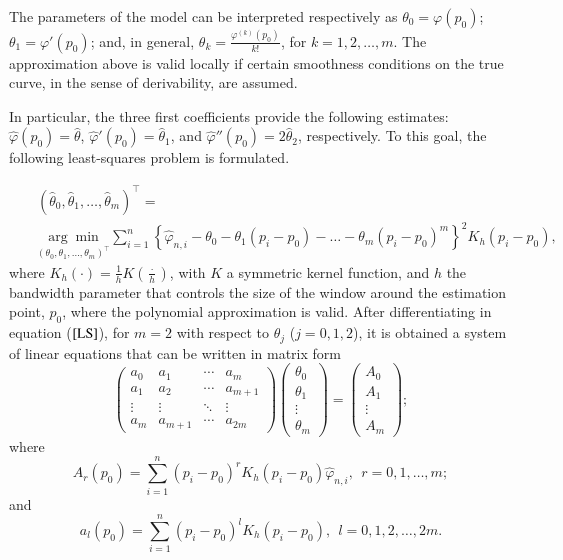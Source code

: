 \documentclass[preprint,12pt]{elsarticle}
\begin{document}
The parameters of the model can be interpreted respectively as $\theta_0={\varphi}(p_0)$; ${\theta}_1={\varphi'}(p_0)$; and, in general, ${\theta}_k=\frac{\varphi^{(k)}(p_0)}{k!}$, for $k=1,2,\ldots,m$. The approximation above is valid locally if certain smoothness conditions on the true curve, in the sense of derivability, are assumed. 

In particular, the three first coefficients provide the following estimates: $\widehat{\varphi}(p_0)=\widehat{\theta}$, $\widehat{\varphi}'(p_0)=\widehat{\theta}_1$, and $\widehat{\varphi}''(p_0)=2\widehat{\theta}_2$, respectively.
To this goal, the following least-squares problem is formulated.

\begin{eqnarray}\label{LS}
&&\left(\widehat{\theta}_0,\widehat{\theta}_1,\ldots,\widehat{\theta}_m\right)^{\intercal}= \\
\nonumber &&\underset{\left({\theta}_0,\theta_1,\ldots, {\theta}_m\right)^{\intercal}}{\arg \min} \sum_{i=1}^n\left\{\widehat{\varphi}_{n,i}-\theta_0-\theta_1(p_i-p_0)-\ldots-\theta_m(p_i-p_0)^m\right\}^2 K_h(p_i-p_0),
\end{eqnarray}
where $K_h(\cdot)=\frac{1}{h}K(\frac{\cdot}{h})$, with $K$ a symmetric kernel function, and $h$ the bandwidth parameter that controls the size of the window around the estimation point, $p_0$, where the polynomial approximation is valid.
After differentiating in equation ($\ref{LS}$), for $m=2$ with respect to $\theta_j$ ($j=0, 1, 2$), it is obtained a system of linear equations that can be written in matrix form
\begin{equation}\label{score}
\left(\begin{array}{cccc}
a_0 & a_1&\cdots &a_m \\ 
a_{1} & a_2&\cdots &a_{m+1}\\
\vdots & \vdots &\ddots &\vdots \\ 
a_m & a_{m+1}&\cdots &a_{2 m} 
\end{array}\right)
\left(\begin{array}{c}
 \theta_0 \\ 
\theta_1 \\ 
\vdots \\
\theta_m
 \end{array}\right)=
\left(\begin{array}{c} 
A_0 \\ 
A_1 \\ 
\vdots \\
A_m
 \end{array}\right);
\end{equation}
where 
\begin{equation}\label{bigA}
A_r(p_0)=\sum_{i=1}^n (p_i-p_0)^r K_h(p_i-p_0)\widehat{\varphi}_{n,i}, \ \ r=0,1,\ldots,m;
\end{equation}
and 
\begin{equation}\label{smallA}
a_l(p_0)=\sum_{i=1}^n(p_i-p_0)^l K_h(p_i-p_0), \ \ l=0,1,2,\ldots,2m.
\end{equation}
\end{document}
